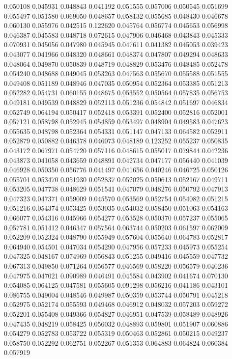 0.050108
0.045931
0.048843
0.041192
0.051555
0.057006
0.050545
0.051699
0.055497
0.051580
0.069050
0.048657
0.058132
0.055685
0.048430
0.046678
0.060130
0.055976
0.042515
0.122620
0.045764
0.056774
0.045653
0.056998
0.046387
0.045583
0.048718
0.072615
0.047906
0.046468
0.043843
0.045333
0.070931
0.045056
0.047980
0.045945
0.047611
0.041382
0.045053
0.039423
0.043077
0.041966
0.048320
0.048661
0.048374
0.047807
0.049294
0.048633
0.048064
0.049870
0.050839
0.048719
0.048829
0.053476
0.048485
0.052478
0.054240
0.048688
0.049045
0.053263
0.047563
0.055670
0.055588
0.051555
0.049408
0.051189
0.048946
0.047035
0.050954
0.052364
0.053385
0.051213
0.052282
0.054731
0.060155
0.048675
0.053552
0.050564
0.057835
0.056753
0.049181
0.049539
0.048829
0.052113
0.051236
0.054842
0.051697
0.046834
0.052749
0.064194
0.050417
0.052418
0.053391
0.052400
0.052816
0.052001
0.057121
0.058798
0.052945
0.054859
0.053497
0.048904
0.049583
0.047623
0.055635
0.048798
0.052364
0.054331
0.051147
0.047133
0.064582
0.052911
0.052879
0.050882
0.046378
0.046073
0.048189
0.123252
0.055237
0.050835
0.043172
0.067971
0.054720
0.057116
0.048615
0.055017
0.079844
0.042236
0.043873
0.041058
0.043659
0.048891
0.042734
0.047177
0.056440
0.041039
0.046928
0.050350
0.056776
0.041497
0.041656
0.040246
0.046725
0.050126
0.055701
0.053470
0.051930
0.052837
0.052025
0.050613
0.052167
0.049711
0.053205
0.047738
0.048629
0.051541
0.047079
0.048276
0.050792
0.047913
0.047323
0.047371
0.059009
0.045570
0.053569
0.052754
0.054082
0.051215
0.051216
0.054374
0.053425
0.053035
0.054032
0.058450
0.051063
0.054163
0.066077
0.054316
0.045966
0.054277
0.053528
0.050370
0.057237
0.055065
0.057781
0.051412
0.046347
0.057564
0.063744
0.050203
0.061597
0.062009
0.052209
0.052324
0.048790
0.055949
0.057604
0.055640
0.064783
0.052817
0.064940
0.054501
0.047034
0.054290
0.047956
0.057233
0.045973
0.055254
0.047325
0.048167
0.074969
0.056843
0.051255
0.049416
0.045559
0.047732
0.067313
0.049850
0.071264
0.056577
0.046569
0.058220
0.056579
0.040236
0.047975
0.047021
0.090989
0.046491
0.045584
0.043902
0.041674
0.070130
0.054085
0.064125
0.047581
0.055605
0.091298
0.056216
0.041186
0.043101
0.086755
0.049004
0.048546
0.049987
0.050359
0.053744
0.050791
0.045218
0.052975
0.052174
0.055593
0.049468
0.046912
0.048032
0.057203
0.059272
0.052201
0.055408
0.049366
0.054827
0.046951
0.047539
0.058489
0.048926
0.047435
0.048219
0.058425
0.056032
0.048893
0.059801
0.051907
0.060886
0.054279
0.052783
0.053722
0.055319
0.050463
0.052861
0.050215
0.049237
0.058750
0.052292
0.062751
0.052267
0.051353
0.064883
0.064824
0.060384
0.057919
